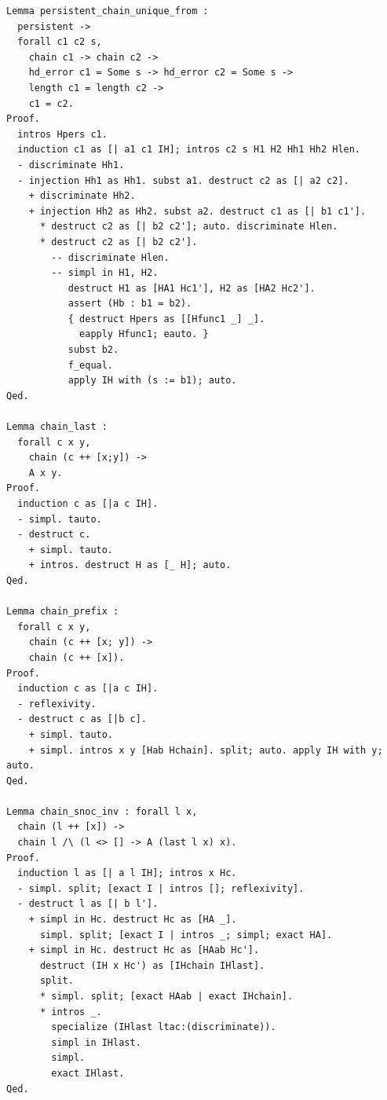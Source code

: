 \begin{latin}
\begin{verbatim}
Lemma persistent_chain_unique_from :
  persistent ->
  forall c1 c2 s,
    chain c1 -> chain c2 ->
    hd_error c1 = Some s -> hd_error c2 = Some s ->
    length c1 = length c2 ->
    c1 = c2.
Proof.
  intros Hpers c1.
  induction c1 as [| a1 c1 IH]; intros c2 s H1 H2 Hh1 Hh2 Hlen.
  - discriminate Hh1.
  - injection Hh1 as Hh1. subst a1. destruct c2 as [| a2 c2].
    + discriminate Hh2.
    + injection Hh2 as Hh2. subst a2. destruct c1 as [| b1 c1'].
      * destruct c2 as [| b2 c2']; auto. discriminate Hlen.
      * destruct c2 as [| b2 c2'].
        -- discriminate Hlen.
        -- simpl in H1, H2.
           destruct H1 as [HA1 Hc1'], H2 as [HA2 Hc2'].
           assert (Hb : b1 = b2).
           { destruct Hpers as [[Hfunc1 _] _].
             eapply Hfunc1; eauto. }
           subst b2.
           f_equal.
           apply IH with (s := b1); auto.
Qed.

Lemma chain_last :
  forall c x y,
    chain (c ++ [x;y]) ->
    A x y.
Proof.
  induction c as [|a c IH].
  - simpl. tauto.
  - destruct c.
    + simpl. tauto.
    + intros. destruct H as [_ H]; auto.
Qed.

Lemma chain_prefix :
  forall c x y,
    chain (c ++ [x; y]) ->
    chain (c ++ [x]).
Proof.
  induction c as [|a c IH].
  - reflexivity.
  - destruct c as [|b c].
    + simpl. tauto.
    + simpl. intros x y [Hab Hchain]. split; auto. apply IH with y; auto.
Qed.

Lemma chain_snoc_inv : forall l x,
  chain (l ++ [x]) ->
  chain l /\ (l <> [] -> A (last l x) x).
Proof.
  induction l as [| a l IH]; intros x Hc.
  - simpl. split; [exact I | intros []; reflexivity].
  - destruct l as [| b l'].
    + simpl in Hc. destruct Hc as [HA _].
      simpl. split; [exact I | intros _; simpl; exact HA].
    + simpl in Hc. destruct Hc as [HAab Hc'].
      destruct (IH x Hc') as [IHchain IHlast].
      split.
      * simpl. split; [exact HAab | exact IHchain].
      * intros _.
        specialize (IHlast ltac:(discriminate)).
        simpl in IHlast.
        simpl.
        exact IHlast.
Qed.


\end{verbatim}
\end{latin}
